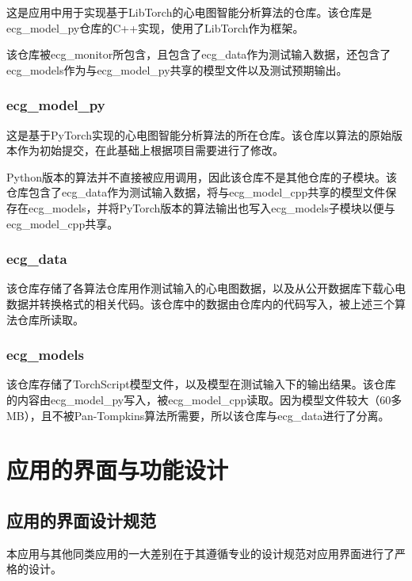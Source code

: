 这是应用中用于实现基于LibTorch的心电图智能分析算法的仓库。该仓库是ecg\_model\_py仓库的C++实现，使用了LibTorch作为框架。

该仓库被ecg\_monitor所包含，且包含了ecg\_data作为测试输入数据，还包含了ecg\_models作为与ecg\_model\_py共享的模型文件以及测试预期输出。

\subsubsection{ecg\_model\_py}\label{subsubsec:repo-py}

这是基于PyTorch实现的心电图智能分析算法的所在仓库。该仓库以算法的原始版本作为初始提交，在此基础上根据项目需要进行了修改。

Python版本的算法并不直接被应用调用，因此该仓库不是其他仓库的子模块。该仓库包含了ecg\_data作为测试输入数据，将与ecg\_model\_cpp共享的模型文件保存在ecg\_models，并将PyTorch版本的算法输出也写入ecg\_models子模块以便与ecg\_model\_cpp共享。

\subsubsection{ecg\_data}\label{subsubsec:repo-data}

该仓库存储了各算法仓库用作测试输入的心电图数据，以及从公开数据库下载心电数据并转换格式的相关代码。该仓库中的数据由仓库内的代码写入，被上述三个算法仓库所读取。

\subsubsection{ecg\_models}\label{subsubsec:repo-models}

该仓库存储了TorchScript模型文件，以及模型在测试输入下的输出结果。该仓库的内容由ecg\_model\_py写入，被ecg\_model\_cpp读取。因为模型文件较大（60多MB），且不被Pan-Tompkins算法所需要，所以该仓库与ecg\_data进行了分离。


\section{应用的界面与功能设计}\label{sec:app-design}

\subsection{应用的界面设计规范}\label{subsec:app-design-spec}

本应用与其他同类应用的一大差别在于其遵循专业的设计规范对应用界面进行了严格的设计。

